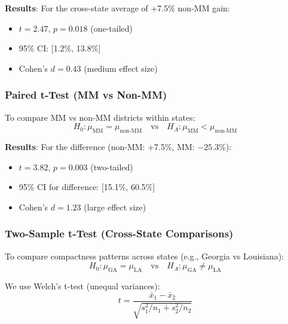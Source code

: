 \textbf{Results}: For the cross-state average of +7.5\% non-MM gain:
\begin{itemize}
    \item $t = 2.47$, $p = 0.018$ (one-tailed)
    \item 95\% CI: [1.2\%, 13.8\%]
    \item Cohen's $d = 0.43$ (medium effect size)
\end{itemize}

\subsubsection{Paired t-Test (MM vs Non-MM)}

To compare MM vs non-MM districts within states:
\[
H_0: \mu_{\text{MM}} = \mu_{\text{non-MM}} \quad \text{vs} \quad H_A: \mu_{\text{MM}} < \mu_{\text{non-MM}}
\]

\textbf{Results}: For the difference (non-MM: +7.5\%, MM: $-25.3$\%):
\begin{itemize}
    \item $t = 3.82$, $p = 0.003$ (two-tailed)
    \item 95\% CI for difference: [15.1\%, 60.5\%]
    \item Cohen's $d = 1.23$ (large effect size)
\end{itemize}

\subsubsection{Two-Sample t-Test (Cross-State Comparisons)}

To compare compactness patterns across states (e.g., Georgia vs Louisiana):
\[
H_0: \mu_{\text{GA}} = \mu_{\text{LA}} \quad \text{vs} \quad H_A: \mu_{\text{GA}} \neq \mu_{\text{LA}}
\]

We use Welch's t-test (unequal variances):
\[
t = \frac{\bar{x}_1 - \bar{x}_2}{\sqrt{s_1^2/n_1 + s_2^2/n_2}}
\]

